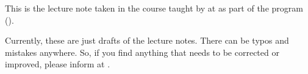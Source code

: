 \begin{myminipage} 
     This is the lecture note taken in the course \textit{\courseloc} taught by \profloc{} at \instituteloc{} as part of the \classloc{} program (\sessionloc).
     
     Currently, these are just drafts of the lecture notes. There can be typos and mistakes anywhere. So, if you find anything that needs to be corrected or improved, please inform at \myemailloc. \bigskip

\end{myminipage}
